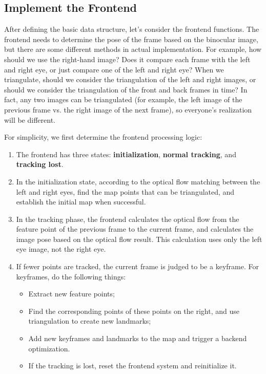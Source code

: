 \subsection{Implement the Frontend}
After defining the basic data structure, let's consider the frontend functions. The frontend needs to determine the pose of the frame based on the binocular image, but there are some different methods in actual implementation. For example, how should we use the right-hand image? Does it compare each frame with the left and right eye, or just compare one of the left and right eye? When we triangulate, should we consider the triangulation of the left and right images, or should we consider the triangulation of the front and back frames in time? In fact, any two images can be triangulated (for example, the left image of the previous frame vs. the right image of the next frame), so everyone's realization will be different.

For simplicity, we first determine the frontend processing logic:
\begin{enumerate}
	\item The frontend has three states: \textbf{initialization}, \textbf{normal tracking}, and \textbf{tracking lost}.
	\item In the initialization state, according to the optical flow matching between the left and right eyes, find the map points that can be triangulated, and establish the initial map when successful.
	\item In the tracking phase, the frontend calculates the optical flow from the feature point of the previous frame to the current frame, and calculates the image pose based on the optical flow result. This calculation uses only the left eye image, not the right eye.
	\item If fewer points are tracked, the current frame is judged to be a keyframe. For keyframes, do the following things:
	
	\begin{itemize}
		\item Extract new feature points;
		\item Find the corresponding points of these points on the right, and use triangulation to create new landmarks;
		\item Add new keyframes and landmarks to the map and trigger a backend optimization.
		\item If the tracking is lost, reset the frontend system and reinitialize it.
	\end{itemize}
\end{enumerate}

